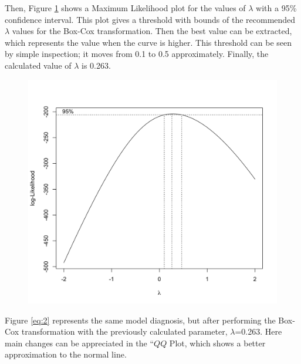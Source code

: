 \documentclass[10pt,leter,openany]{article}
\begin{document}
		Then, Figure  \ref{fig:max_likelihood} shows a Maximum Likelihood plot for the values of $\lambda$ with a 95\% confidence interval. This plot gives a threshold with bounds of the recommended $\lambda$ values for the Box-Cox transformation. Then the best value can be extracted, which represents the value when the curve is higher. This threshold can be seen by simple inspection; it moves from 0.1 to 0.5 approximately. Finally, the calculated value of $\lambda$ is 0.263.

		\begin{figure}
			\begin{center}
				\includegraphics[scale=0.20]{extras/likelihood}
				\label{fig:max_likelihood}
			\end{center}
		\end{figure}

		Figure \ref{eq:2} represents the same model diagnosis, but after performing the Box-Cox transformation with the previously calculated parameter, $\lambda$=0.263. Here main changes can be appreciated in the ``$QQ$ Plot, which shows a better approximation to the normal line.
\end{document}
